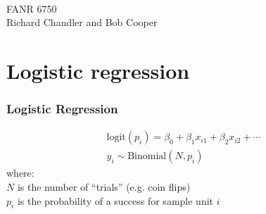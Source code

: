 \documentclass[color=usenames,dvipsnames]{beamer}\usepackage[]{graphicx}\usepackage[]{color}
\begin{document}




\begin{frame}[plain]
  \huge
  \centering \par
  {\color{RoyalBlue}{Lab 13 -- Generalized Linear Models}} \\
  \vspace{1cm}
  \LARGE
  FANR 6750 \\
  \vfill
  \large
  Richard Chandler and Bob Cooper
\end{frame}





\section{Logistic regression}


\begin{frame}
  \frametitle{Logistic Regression}
  \large
    \begin{gather*}
      \mathrm{logit}(p_i) = \beta_0 + \beta_1 x_{i1} + \beta_2 x_{i2} + \cdots \\
      y_i \sim \mathrm{Binomial}(N, p_i)
  \end{gather*}
  \pause
  {%
    where: \\}
  $N$ is the number of ``trials'' (e.g. coin flips) \\
  $p_i$ is the probability of a success for sample unit $i$
\end{frame}
\end{document}
